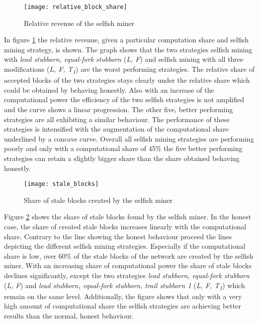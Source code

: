 \begin{figure}[t]
\texttt{[image: relative\_block\_share]}
\centering
\caption{Relative revenue of the selfish miner}
\label{fig:relative_block_share}
\end{figure}

In figure \ref{fig:relative_block_share} the relative revenue, given a particular computation share and selfish mining strategy, is shown.
The graph shows that the two strategies selfish mining with \textit{lead stubborn, equal-fork stubborn} (\textit{L, F}) and selfish mining with all three modifications (\textit{L, F, T\textsubscript{1}}) are the worst performing strategies.
The relative share of accepted blocks of the two strategies stays clearly under the relative share which could be obtained by behaving honestly.
Also with an increase of the computational power the efficiency of the two selfish strategies is not amplified and the curve shows a linear progression.
The other five, better performing strategies are all exhibiting a similar behaviour.
The performance of these strategies is intensified with the augmentation of the computational share underlined by a concave curve.
Overall all selfish mining strategies are performing poorly and only with a computational share of 45\% the five better performing strategies can retain a slightly bigger share than the share obtained behaving honestly.

\begin{figure}[t]
\texttt{[image: stale\_blocks]}
\centering
\caption{Share of stale blocks created by the selfish miner}
\label{fig:stale_blocks}
\end{figure}

Figure \ref{fig:stale_blocks} shows the share of stale blocks found by the selfish miner.
In the honest case, the share of created stale blocks increases linearly with the computational share.
Contrary to the line showing the honest behaviour proceed the lines depicting the different selfish mining strategies.
Especially if the computational share is low, over 60\% of the stale blocks of the network are created by the selfish miner.
With an increasing share of computational power the share of stale blocks declines significantly, except the two strategies \textit{lead stubborn, equal-fork stubborn} (\textit{L, F}) and \textit{lead stubborn, equal-fork stubborn, trail stubborn 1} (\textit{L, F, T\textsubscript{1}}) which remain on the same level.
Additionally, the figure shows that only with a very high amount of computational share the selfish strategies are achieving better results than the normal, honest behaviour.


